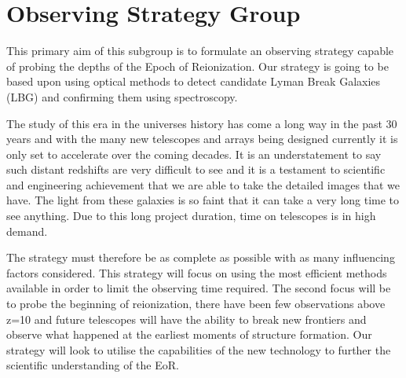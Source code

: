 \section{Observing Strategy Group} %
\label{sec:observing_strategy_group}
	This primary aim of this subgroup is to formulate an observing strategy capable of probing the depths of the Epoch of Reionization. Our strategy is going to be based upon using optical methods to detect candidate Lyman Break Galaxies (LBG) and confirming them using spectroscopy.

	The study of this era in the universes history has come a long way in the past 30 years and with the many new telescopes and arrays being designed currently it is only set to accelerate over the coming decades. It is an understatement to say such distant redshifts are very difficult to see and it is a testament to scientific and engineering achievement that we are able to take the detailed images that we have. The light from these galaxies is so faint that it can take a very long time to see anything. Due to this long project duration, time on telescopes is in high demand. 

	The strategy must therefore be as complete as possible with as many influencing factors considered. This strategy will focus on using the most efficient methods available in order to limit the observing time required. The second focus will be to probe the beginning of reionization, there have been few observations above z=10 and future telescopes will have the ability to break new frontiers and observe what happened at the earliest moments of structure formation. Our strategy will look to utilise the capabilities of the new technology to further the scientific understanding of the EoR.

